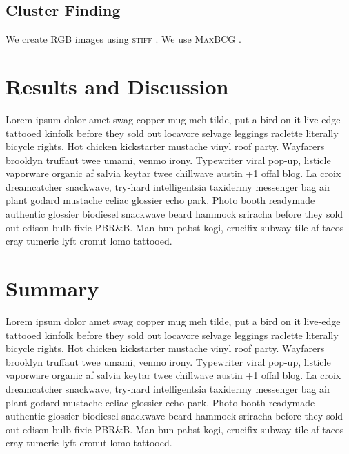 \documentclass[apj, revtex4]{emulateapj}
\begin{document}
\subsection{Cluster Finding}
We create RGB images using \textsc{stiff} \citep{Bertin2011}. We use \textsc{MaxBCG} \citep{Koester2007b}.

\section{Results and Discussion}\label{sec:results}

Lorem ipsum dolor amet swag copper mug meh tilde, put a bird on it live-edge tattooed kinfolk before they sold out locavore selvage leggings raclette literally bicycle rights. Hot chicken kickstarter mustache vinyl roof party. Wayfarers brooklyn truffaut twee umami, venmo irony. Typewriter viral pop-up, listicle vaporware organic af salvia keytar twee chillwave austin +1 offal blog. La croix dreamcatcher snackwave, try-hard intelligentsia taxidermy messenger bag air plant godard mustache celiac glossier echo park. Photo booth readymade authentic glossier biodiesel snackwave beard hammock sriracha before they sold out edison bulb fixie PBR\&B. Man bun pabst kogi, crucifix subway tile af tacos cray tumeric lyft cronut lomo tattooed.

\section{Summary}\label{sec:summary}

Lorem ipsum dolor amet swag copper mug meh tilde, put a bird on it live-edge tattooed kinfolk before they sold out locavore selvage leggings raclette literally bicycle rights. Hot chicken kickstarter mustache vinyl roof party. Wayfarers brooklyn truffaut twee umami, venmo irony. Typewriter viral pop-up, listicle vaporware organic af salvia keytar twee chillwave austin +1 offal blog. La croix dreamcatcher snackwave, try-hard intelligentsia taxidermy messenger bag air plant godard mustache celiac glossier echo park. Photo booth readymade authentic glossier biodiesel snackwave beard hammock sriracha before they sold out edison bulb fixie PBR\&B. Man bun pabst kogi, crucifix subway tile af tacos cray tumeric lyft cronut lomo tattooed.
\end{document}
